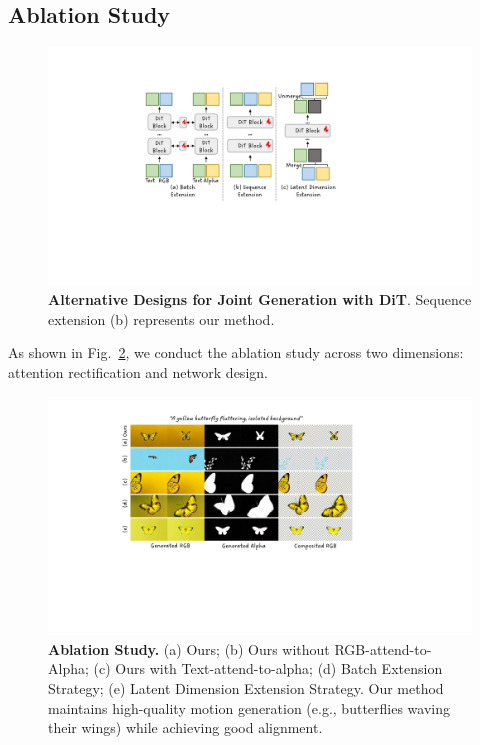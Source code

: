 \subsection{Ablation Study}
\begin{figure}[htbp]
    \centering
    \includegraphics[width=1.0\linewidth]{figs/discussions.pdf}
    \caption{\textbf{Alternative Designs for Joint Generation with DiT}. Sequence extension (b) represents our method.}
    \label{fig-arch}
\end{figure}
As shown in Fig.~\ref{fig-ablation}, we conduct the ablation study across two dimensions: attention rectification and network design.
\begin{figure}[h]
    \centering
    \includegraphics[width=1.0\linewidth]{figs/exp-ablation.pdf}
    \caption{\textbf{Ablation Study.} (a) Ours; (b) Ours without RGB-attend-to-Alpha; (c) Ours with Text-attend-to-alpha; (d) Batch Extension Strategy; (e) Latent Dimension Extension Strategy. Our method maintains high-quality motion generation (e.g., butterflies waving their wings) while achieving good alignment.}
    \label{fig-ablation}
\end{figure}



